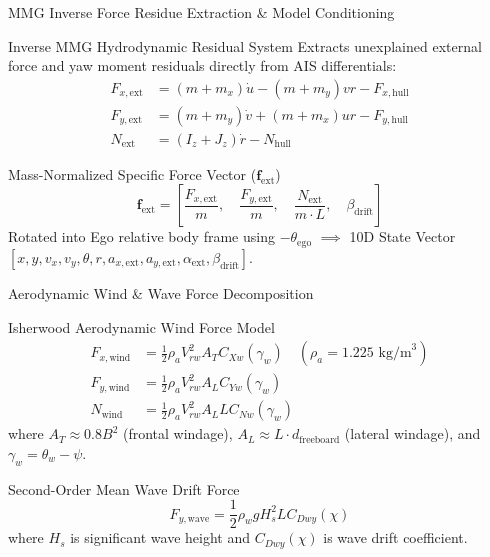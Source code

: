 \documentclass[t]{beamer}
\begin{document}
\begin{frame}{MMG Inverse Force Residue Extraction \& Model Conditioning}
    \begin{block}{Inverse MMG Hydrodynamic Residual System}
        Extracts unexplained external force and yaw moment residuals directly from AIS differentials:
        $$\begin{aligned}
        F_{x,\mathrm{ext}} &= (m + m_x) \dot{u} - (m + m_y) v r - F_{x,\mathrm{hull}} \\
        F_{y,\mathrm{ext}} &= (m + m_y) \dot{v} + (m + m_x) u r - F_{y,\mathrm{hull}} \\
        N_{\mathrm{ext}} &= (I_z + J_z) \dot{r} - N_{\mathrm{hull}}
        \end{aligned}$$
    \end{block}

    \begin{block}{Mass-Normalized Specific Force Vector ($\mathbf{f}_{\mathrm{ext}}$)}
        $$\mathbf{f}_{\mathrm{ext}} = \left[ \frac{F_{x,\mathrm{ext}}}{m}, \quad \frac{F_{y,\mathrm{ext}}}{m}, \quad \frac{N_{\mathrm{ext}}}{m \cdot L}, \quad \beta_{\mathrm{drift}} \right]$$
        Rotated into Ego relative body frame using $-\theta_{\mathrm{ego}}$ $\implies$ 10D State Vector $[x, y, v_x, v_y, \theta, r, a_{x,\mathrm{ext}}, a_{y,\mathrm{ext}}, \alpha_{\mathrm{ext}}, \beta_{\mathrm{drift}}]$.
    \end{block}
\end{frame}


\begin{frame}{Aerodynamic Wind \& Wave Force Decomposition}
    \begin{block}{Isherwood Aerodynamic Wind Force Model}
        $$\begin{aligned}
        F_{x,\mathrm{wind}} &= \frac{1}{2} \rho_a V_{rw}^2 A_T C_{Xw}(\gamma_w) \quad (\rho_a = 1.225\text{ kg/m}^3) \\
        F_{y,\mathrm{wind}} &= \frac{1}{2} \rho_a V_{rw}^2 A_L C_{Yw}(\gamma_w) \\
        N_{\mathrm{wind}} &= \frac{1}{2} \rho_a V_{rw}^2 A_L L C_{Nw}(\gamma_w)
        \end{aligned}$$
        where $A_T \approx 0.8 B^2$ (frontal windage), $A_L \approx L \cdot d_{\mathrm{freeboard}}$ (lateral windage), and $\gamma_w = \theta_w - \psi$.
    \end{block}

    \begin{block}{Second-Order Mean Wave Drift Force}
        $$F_{y,\mathrm{wave}} = \frac{1}{2} \rho_w g H_s^2 L C_{Dwy}(\chi)$$
        where $H_s$ is significant wave height and $C_{Dwy}(\chi)$ is wave drift coefficient.
    \end{block}
\end{frame}
\end{document}
